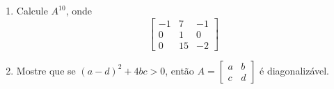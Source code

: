 \documentclass[a4paper,5pt]{amsbook}
\begin{document}
\begin{enumerate}
	\vspace{0.5cm}
	\item Calcule $A^{10}$, onde
		\[\begin{bmatrix}
			-1 & 7 & -1 \\
			0 & 1 & 0 \\
			0 & 15 & -2
		\end{bmatrix}\]

	\vspace{0.5cm}
	\item Mostre que se $(a-d)^2 + 4bc > 0$, ent\~ao
		$A = \begin{bmatrix}
			a & b \\
			c & d
		\end{bmatrix}$
		\'e diagonaliz\'avel.
\end{enumerate}
\end{document}

